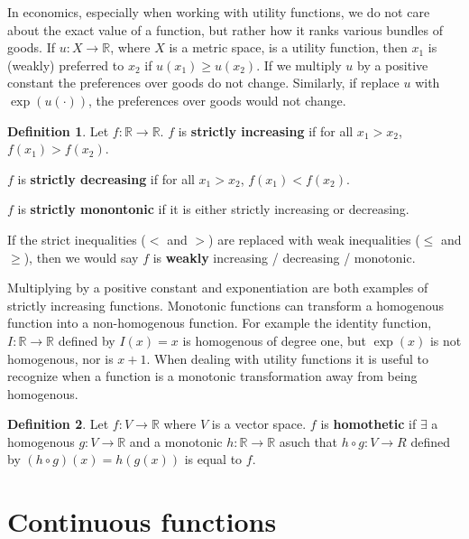 \documentclass[12pt,reqno]{amsart}
\theoremstyle{definition}
\newtheorem{definition}{Definition}[section]
\def\R{\mathbb{R}}
\renewcommand{\to}{{\rightarrow}}
\begin{document}
In economics, especially when working with utility functions, we do
not care about the exact value of a function, but rather how it ranks
various bundles of goods. If $u: X \to \R$, where $X$ is a metric
space, is a utility function, then $x_1$ is (weakly) preferred to
$x_2$ if $u(x_1) \geq u(x_2)$. If we multiply $u$ by a positive
constant the preferences over goods do not change. Similarly, if
replace $u$ with $\exp( u(\cdot))$, the preferences over goods would
not change. 
\begin{definition}
  Let $f: \R \to \R$. $f$ is \textbf{strictly increasing} if for all
  $x_1 > x_2$, $f(x_1) > f(x_2)$.
  
  $f$ is  \textbf{strictly decreasing} if for all
  $x_1 > x_2$, $f(x_1) < f(x_2)$.

  $f$ is \textbf{strictly monontonic} if it is either strictly
  increasing or decreasing. 

  If the strict inequalities ($<$ and $>$) are replaced with weak
  inequalities ($\leq$ and $\geq$), then we would say $f$ is
  \textbf{weakly} increasing / decreasing / monotonic. 
\end{definition}
Multiplying by a positive constant and exponentiation are both
examples of strictly increasing functions. Monotonic functions can
transform a homogenous function into a non-homogenous function. For
example the identity function, $I: \R \to \R$ defined by $I(x) = x$ is
homogenous of degree one, but $\exp(x)$ is not homogenous, nor is $x +
1$. When dealing with utility functions it is useful to recognize when
a function is a monotonic transformation away from being homogenous.
\begin{definition}
  Let $f: V \to \R$ where $V$ is a vector space. $f$ is
  \textbf{homothetic} if $\exists$ a homogenous $g: V \to \R$ and a
  monotonic $h: \R \to \R$ asuch that $h \circ g: V \to R$ defined by
  $(h \circ g) (x) = h(g(x))$ is equal to $f$.
\end{definition}


\section{Continuous functions}
\end{document}
